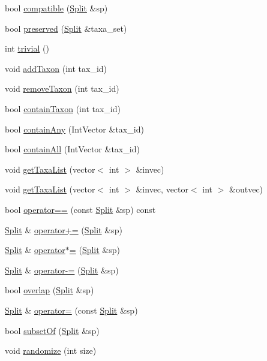 \begin{DoxyCompactItemize}
bool \hyperlink{classSplit_afbf535c1d11bf7651ecd733045f2d688}{compatible} (\hyperlink{classSplit}{Split} \&sp)
\item 
bool \hyperlink{classSplit_a164299ace7e47de37ebe8f9daeda8fc8}{preserved} (\hyperlink{classSplit}{Split} \&taxa\_\-set)
\item 
int \hyperlink{classSplit_a96875580ea7a3e02f013951ba4b41596}{trivial} ()
\item 
void \hyperlink{classSplit_a35b159b165b623a7ee1d33bab6a1368f}{addTaxon} (int tax\_\-id)
\item 
void \hyperlink{classSplit_a35df7b8abdab57e1a8a097909a125396}{removeTaxon} (int tax\_\-id)
\item 
bool \hyperlink{classSplit_a080cf81fd05ba6487dfd9130b8b9787b}{containTaxon} (int tax\_\-id)
\item 
bool \hyperlink{classSplit_afffa3f41c2edcf5c66e8875a8151941d}{containAny} (IntVector \&tax\_\-id)
\item 
bool \hyperlink{classSplit_aaac9e8b488cf55b0d92bee3687abf40e}{containAll} (IntVector \&tax\_\-id)
\item 
void \hyperlink{classSplit_a6432380add76d5dd97ed106e2d6d10e6}{getTaxaList} (vector$<$ int $>$ \&invec)
\item 
void \hyperlink{classSplit_ab8f398ac2532dbeb5697cb2fc4e5ce6b}{getTaxaList} (vector$<$ int $>$ \&invec, vector$<$ int $>$ \&outvec)
\item 
bool \hyperlink{classSplit_ad74cb390339b148f3bc45e3e4db8ac58}{operator==} (const \hyperlink{classSplit}{Split} \&sp) const 
\item 
\hyperlink{classSplit}{Split} \& \hyperlink{classSplit_a553102b9ea76d19445a4071b822d17b0}{operator+=} (\hyperlink{classSplit}{Split} \&sp)
\item 
\hyperlink{classSplit}{Split} \& \hyperlink{classSplit_ac9be6ec283224b571f14353f348b251e}{operator$\ast$=} (\hyperlink{classSplit}{Split} \&sp)
\item 
\hyperlink{classSplit}{Split} \& \hyperlink{classSplit_a510547abdad1acc043c104810a936fa8}{operator-\/=} (\hyperlink{classSplit}{Split} \&sp)
\item 
bool \hyperlink{classSplit_a50109c1755bdaa7143295515bcd5be44}{overlap} (\hyperlink{classSplit}{Split} \&sp)
\item 
\hyperlink{classSplit}{Split} \& \hyperlink{classSplit_ab8d66a1714b54f7e1a1a0c714b2e1175}{operator=} (const \hyperlink{classSplit}{Split} \&sp)
\item 
bool \hyperlink{classSplit_a724c4b8226835191fb058048f5a5aff3}{subsetOf} (\hyperlink{classSplit}{Split} \&sp)
\item 
void \hyperlink{classSplit_aba2bc06ac8b0864cd7210e181de41275}{randomize} (int size)
\end{DoxyCompactItemize}
